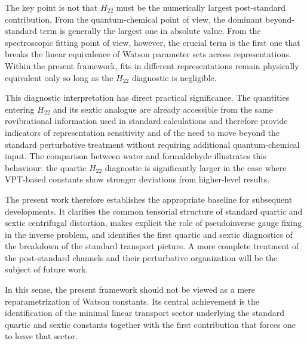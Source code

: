 The key point is not that $H_{22}$ must be the numerically largest
post-standard contribution. From the quantum-chemical point of view, the
dominant beyond-standard term is generally the largest one in absolute
value. From the spectroscopic fitting point of view, however, the crucial
term is the first one that breaks the linear equivalence of Watson
parameter sets across representations. Within the present framework,
fits in different representations remain physically equivalent only so
long as the $H_{22}$ diagnostic is negligible.

This diagnostic interpretation has direct practical significance. The
quantities entering $H_{22}$ and its sextic analogue are already
accessible from the same rovibrational information used in standard
calculations and therefore provide indicators of representation
sensitivity and of the need to move beyond the standard perturbative
treatment without requiring additional quantum-chemical input. The
comparison between water and formaldehyde illustrates this behaviour:
the quartic $H_{22}$ diagnostic is significantly larger in the case
where VPT-based constants show stronger deviations from higher-level
results.

The present work therefore establishes the appropriate baseline for
subsequent developments. It clarifies the common tensorial structure of
standard quartic and sextic centrifugal distortion, makes explicit the
role of pseudoinverse gauge fixing in the inverse problem, and
identifies the first quartic and sextic diagnostics of the breakdown of
the standard transport picture. A more complete treatment of the
post-standard channels and their perturbative organization will be the
subject of future work.

In this sense, the present framework should not be viewed as a mere
reparametrization of Watson constants. Its central achievement is the
identification of the minimal linear transport sector underlying the
standard quartic and sextic constants together with the first
contribution that forces one to leave that sector.

